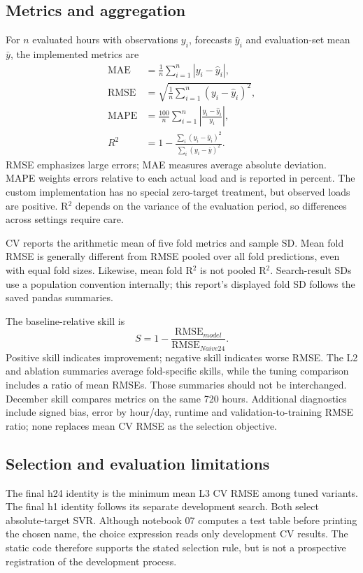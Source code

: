 \subsection{Metrics and aggregation}
For $n$ evaluated hours with observations $y_i$, forecasts $\widehat y_i$ and evaluation-set mean $\bar y$, the implemented metrics are
\begin{align}
\mathrm{MAE}&=\frac{1}{n}\sum_{i=1}^{n}|y_i-\widehat y_i|,\\
\mathrm{RMSE}&=\sqrt{\frac{1}{n}\sum_{i=1}^{n}(y_i-\widehat y_i)^2},\\
\mathrm{MAPE}&=\frac{100}{n}\sum_{i=1}^{n}\left|\frac{y_i-\widehat y_i}{y_i}\right|,\\
R^2&=1-\frac{\sum_i(y_i-\widehat y_i)^2}{\sum_i(y_i-\bar y)^2}.
\label{eq:metrics}
\end{align}
RMSE emphasizes large errors; MAE measures average absolute deviation. MAPE weights errors relative to each actual load and is reported in percent. The custom implementation has no special zero-target treatment, but observed loads are positive. R$^2$ depends on the variance of the evaluation period, so differences across settings require care.

CV reports the arithmetic mean of five fold metrics and sample SD. Mean fold RMSE is generally different from RMSE pooled over all fold predictions, even with equal fold sizes. Likewise, mean fold R$^2$ is not pooled R$^2$. Search-result SDs use a population convention internally; this report's displayed fold SD follows the saved pandas summaries.

The baseline-relative skill is
\begin{equation}
S=1-\frac{\mathrm{RMSE}_{model}}{\mathrm{RMSE}_{Naive24}}.
\label{eq:skill}
\end{equation}
Positive skill indicates improvement; negative skill indicates worse RMSE. The L2 and ablation summaries average fold-specific skills, while the tuning comparison includes a ratio of mean RMSEs. Those summaries should not be interchanged. December skill compares metrics on the same 720 hours. Additional diagnostics include signed bias, error by hour/day, runtime and validation-to-training RMSE ratio; none replaces mean CV RMSE as the selection objective.

\subsection{Selection and evaluation limitations}
The final h24 identity is the minimum mean L3 CV RMSE among tuned variants. The final h1 identity follows its separate development search. Both select absolute-target SVR. Although notebook 07 computes a test table before printing the chosen name, the choice expression reads only development CV results. The static code therefore supports the stated selection rule, but is not a prospective registration of the development process.

